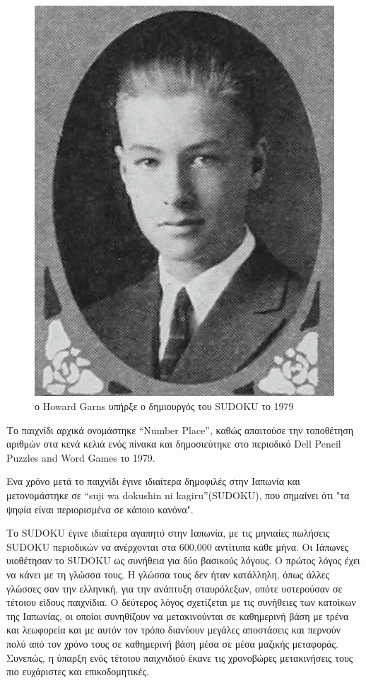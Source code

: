 \documentclass[12pt]{book}
\theoremstyle{definition}
\begin{document}
\begin{figure}[h]
	\centering	
	\includegraphics[scale=0.3]{Figures/Howard Garns.jpeg}
	\caption{ο Howard Garns υπήρξε ο δημιουργός του SUDOKU το 1979}
\end{figure}

Το παιχνίδι αρχικά ονομάστηκε “Number Place”, καθώς απαιτούσε την τοποθέτηση αριθμών στα κενά κελιά ενός πίνακα και
δημοσιεύτηκε στο περιοδικό Dell Pencil Puzzles and Word
Games το 1979. \par

Ενα χρόνο μετά το παιχνίδι έγινε ιδιαίτερα δημοφιλές στην Ιαπωνία και μετονομάστηκε σε “suji wa dokushin ni
kagiru”(SUDOKU), που σημαίνει ότι "τα ψηφία είναι περιορισμένα σε κάποιο κανόνα". \par

Το SUDOKU έγινε ιδιαίτερα αγαπητό στην Ιαπωνία, με τις μηνιαίες πωλήσεις SUDOKU περιοδικών να ανέρχονται στα
600.000 αντίτυπα κάθε μήνα.
Οι Ιάπωνες υιοθέτησαν το SUDOKU ως συνήθεια για δύο
βασικούς λόγους. Ο πρώτος λόγος έχει να κάνει με τη γλώσσα τους. Η γλώσσα τους δεν ήταν κατάλληλη, όπως άλλες γλώσσες σαν την ελληνική, για την ανάπτυξη σταυρόλεξων, οπότε υστερούσαν σε τέτοιου είδους παιχνίδια. Ο δεύτερος λόγος σχετίζεται με τις συνήθειες των κατοίκων της Ιαπωνίας, οι οποίοι συνηθίζουν να μετακινούνται σε καθημερινή βάση με τρένα και λεωφορεία και με αυτόν τον τρόπο διανύουν μεγάλες αποστάσεις και περνούν πολύ από τον χρόνο τους σε καθημερινή βάση μέσα σε μέσα μαζικής μεταφοράς. Συνεπώς, η ύπαρξη ενός τέτοιου παιχνιδιού έκανε τις χρονοβώρες μετακινήσεις τους πιο ευχάριστες και επικοδομητικές. \par 
\end{document}
